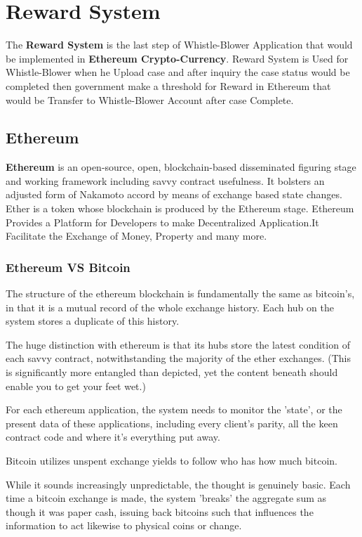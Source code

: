 \chapter{Reward System
	\label{ch:Reward System}}

The \textbf{Reward System} is the last step of Whistle-Blower Application that would be implemented in \textbf {Ethereum Crypto-Currency}.\newline
Reward System is Used for Whistle-Blower when he Upload case and after inquiry the case status would be completed then government make a threshold for Reward in Ethereum that would be Transfer to Whistle-Blower Account after case Complete.    
\section{Ethereum}
\textbf {Ethereum} is an open-source, open, blockchain-based disseminated figuring stage and working framework including savvy contract usefulness. It bolsters an adjusted form of Nakamoto accord by means of exchange based state changes. Ether is a token whose blockchain is produced by the Ethereum stage. 
Ethereum Provides a Platform for Developers to make
Decentralized Application.It Facilitate the Exchange of Money, Property and many
more.
\subsection{Ethereum VS Bitcoin}
The structure of the ethereum blockchain is fundamentally the same as bitcoin's, in that it is a mutual record of the whole exchange history. Each hub on the system stores a duplicate of this history. 

The huge distinction with ethereum is that its hubs store the latest condition of each savvy contract, notwithstanding the majority of the ether exchanges. (This is significantly more entangled than depicted, yet the content beneath should enable you to get your feet wet.) 

For each ethereum application, the system needs to monitor the 'state', or the present data of these applications, including every client's parity, all the keen contract code and where it's everything put away. 

Bitcoin utilizes unspent exchange yields to follow who has how much bitcoin. 

While it sounds increasingly unpredictable, the thought is genuinely basic. Each time a bitcoin exchange is made, the system 'breaks' the aggregate sum as though it was paper cash, issuing back bitcoins such that influences the information to act likewise to physical coins or change. 


